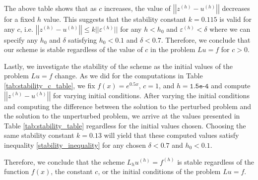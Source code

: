 The above table shows that as $c$ increases, the value of
$\left|\left|z^{(h)} - u^{(h)}\right|\right|$ decreases for a fixed $h$ value. This
suggests that the stability constant $k = 0.115$ is valid for any $c$, i.e.
$\left|\left|z^{(h)} - u^{(h)}\right|\right| \leq k ||\varepsilon ^{(h)}||$ for
any $h < h_0$ and $\varepsilon^{(h)} < \delta$ where we can specify any $h_0$ and
$\delta$ satisfying $h_0 < 0.1$ and $\delta < 0.7$. Therefore, we conclude that
our scheme is stable regardless of the value of $c$ in the problem $Lu = f$ for $c > 0$.

Lastly, we investigate the stability of the scheme as the initial values of the
problem $Lu = f$ change. As we did for the computations in Table \ref{tab:stability_c_table},
we fix $f(x) = e^{0.5x}$, $c=1$, and $h=\texttt{1.5e-4}$ and compute $\left|\left|z^{(h)} - u^{(h)}\right|\right|$
for varying initial conditions. After varying the initial conditions and computing
the difference between the solution to the perturbed problem and the solution to
the unperturbed problem, we arrive at the values presented in Table \ref{tab:stability_table}
regardless for the initial values chosen. Choosing the same stability constant
$k = 0.13$ will yield that these computed values satisfy inequality \eqref{stability_inequality}
for any chosen $\delta < 0.7$ and $h_0 < 0.1$.

Therefore, we conclude that the scheme $L_h u^{(h)} = f^{(h)}$ is stable regardless
of the function $f(x)$, the constant $c$, or the initial conditions of the problem
$Lu = f$.
